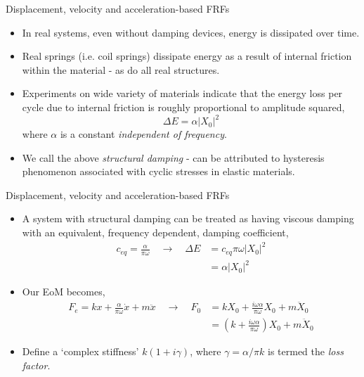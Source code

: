 \documentclass[11pt,aspectratio=169,handout]{beamer}
\begin{document}
\begin{frame}[c]{Displacement, velocity and acceleration-based FRFs}
	\begin{itemize}
		\item<1-> In real systems, even without damping devices, energy is dissipated over time. 
		\item<2-> Real springs (i.e. coil springs) dissipate energy as a result of internal friction within the material - as do all real structures.
		\item<3-> Experiments on wide variety of materials indicate that the energy loss per cycle due to internal friction is roughly proportional to amplitude squared, 
		\begin{equation}
			\Delta E = \alpha |X_0|^2
		\end{equation}
		where $\alpha$ is a constant \textit{independent of frequency}.
		\item<4-> We call the above \textit{structural damping} - can be attributed to hysteresis phenomenon associated with cyclic stresses in elastic materials.
	\end{itemize}
\end{frame}

\begin{frame}[c]{Displacement, velocity and acceleration-based FRFs}
	\begin{itemize}
		\item<1-> A system with structural damping can be treated as having viscous damping with an equivalent, frequency dependent, damping coefficient,
		\begin{align}
			c_{eq} = \frac{\alpha}{\pi\omega} \quad \rightarrow\quad  \Delta E &= c_{eq}\pi\omega |X_0|^2 \\
			&=\alpha|X_0|^2
		\end{align}
	\item<2-> Our EoM becomes, 
	\begin{align}\label{}
		F_e =  kx +  \frac{\alpha}{\pi\omega}  \dot{x} +  m\ddot{x} \quad \rightarrow \quad F_0 &=  kX_0 +  \frac{i\omega \alpha}{\pi\omega} X_0 +m\ddot{X}_0\\
		 &=  {\left(k +  \frac{i\omega \alpha}{\pi\omega} \right)} X_0 +m\ddot{X}_0
	\end{align}
	\item<3-> Define a `complex stiffness' $k(1+i\gamma)$, where $\gamma = \alpha/\pi k$ is termed the \textit{loss factor}.
	\end{itemize}
\end{frame}
\end{document}
